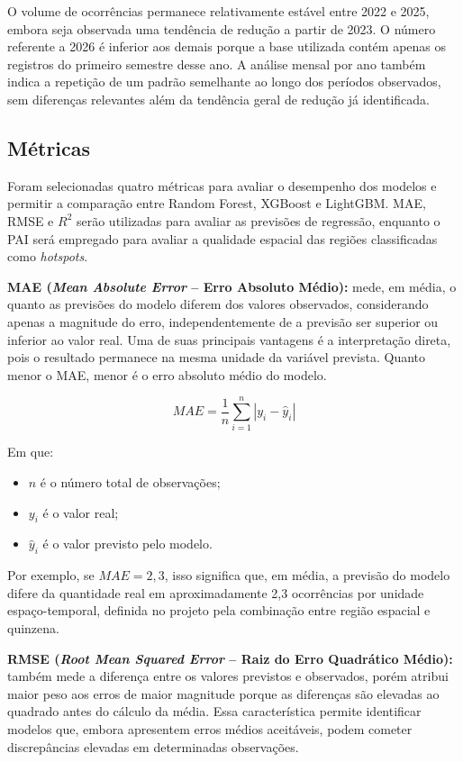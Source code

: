 \documentclass[12pt]{article}
\begin{document}
O volume de ocorrências permanece relativamente estável entre 2022 e 2025, embora seja observada uma tendência de redução a partir de 2023. O número referente a 2026 é inferior aos demais porque a base utilizada contém apenas os registros do primeiro semestre desse ano. A análise mensal por ano também indica a repetição de um padrão semelhante ao longo dos períodos observados, sem diferenças relevantes além da tendência geral de redução já identificada.

\vspace{1cm}

\subsection{Métricas}

Foram selecionadas quatro métricas para avaliar o desempenho dos modelos e permitir a comparação entre Random Forest, XGBoost e LightGBM. MAE, RMSE e $R^2$ serão utilizadas para avaliar as previsões de regressão, enquanto o PAI será empregado para avaliar a qualidade espacial das regiões classificadas como \textit{hotspots}.

\noindent
\textbf{MAE (\textit{Mean Absolute Error} -- Erro Absoluto Médio):} mede, em média, o quanto as previsões do modelo diferem dos valores observados, considerando apenas a magnitude do erro, independentemente de a previsão ser superior ou inferior ao valor real. Uma de suas principais vantagens é a interpretação direta, pois o resultado permanece na mesma unidade da variável prevista. Quanto menor o MAE, menor é o erro absoluto médio do modelo.

\[
MAE = \frac{1}{n}\sum_{i=1}^{n}|y_i-\hat{y}_i|
\]

Em que:
\begin{itemize}
    \item $n$ é o número total de observações;
    \item $y_i$ é o valor real;
    \item $\hat{y}_i$ é o valor previsto pelo modelo.
\end{itemize}

Por exemplo, se $MAE = 2{,}3$, isso significa que, em média, a previsão do modelo difere da quantidade real em aproximadamente 2,3 ocorrências por unidade espaço-temporal, definida no projeto pela combinação entre região espacial e quinzena.

\vspace{1.2cm}
\noindent
\textbf{RMSE (\textit{Root Mean Squared Error} -- Raiz do Erro Quadrático Médio):} também mede a diferença entre os valores previstos e observados, porém atribui maior peso aos erros de maior magnitude porque as diferenças são elevadas ao quadrado antes do cálculo da média. Essa característica permite identificar modelos que, embora apresentem erros médios aceitáveis, podem cometer discrepâncias elevadas em determinadas observações.
\end{document}
